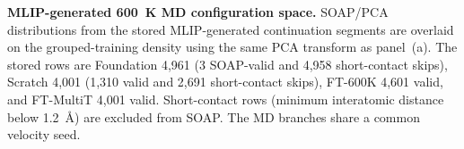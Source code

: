 \caption{\textbf{MLIP-generated 600~K MD configuration space.} SOAP/PCA distributions from the stored MLIP-generated continuation segments are overlaid on the grouped-training density using the same PCA transform as panel~(a). The stored rows are Foundation 4,961 (3 SOAP-valid and 4,958 short-contact skips), Scratch 4,001 (1,310 valid and 2,691 short-contact skips), FT-600K 4,601 valid, and FT-MultiT 4,001 valid. Short-contact rows (minimum interatomic distance below 1.2~\AA) are excluded from SOAP. The MD branches share a common velocity seed.}
\label{fig:task_conditioned_panel_c}

